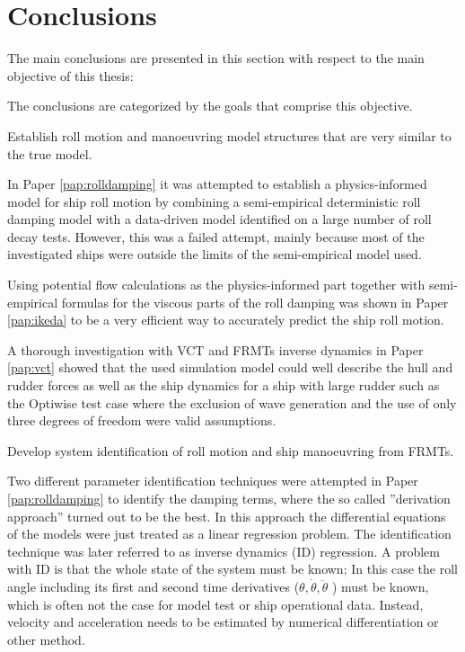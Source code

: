 \chapter{Conclusions\label{ch:conclusions}}

The main conclusions are presented in this section with respect to the main objective of this thesis:
\begin{tcolorbox}[sharp corners,title=Objective]
\objective
\end{tcolorbox}
\vspace{0.3cm}
\noindent The conclusions are categorized by the goals that comprise this objective.

\begin{tcolorbox}[sharp corners,title=RO1]
Establish roll motion and manoeuvring model structures that are very similar to the true model.
\end{tcolorbox}
In Paper \ref{pap:rolldamping} it was attempted to establish a physics-informed model for ship roll motion by combining a semi-empirical deterministic roll damping model with a data-driven model identified on a large number of roll decay tests. However, this was a failed attempt, mainly because most of the investigated ships were outside the limits of the semi-empirical model used.  

Using potential flow calculations as the physics-informed part together with semi-empirical formulas for the viscous parts of the roll damping was shown in Paper \ref{pap:ikeda} to be a very efficient way to accurately predict the ship roll motion.

A thorough investigation with VCT and FRMTs inverse dynamics in Paper \ref{pap:vct} showed that the used simulation model could well describe the hull and rudder forces as well as the ship dynamics for a ship with large rudder such as the Optiwise test case where the exclusion of wave generation and the use of only three degrees of freedom were valid assumptions. 

\begin{tcolorbox}[sharp corners,title=RO2]
Develop system identification of roll motion and ship manoeuvring from FRMTs.
\end{tcolorbox}
Two different parameter identification techniques were attempted in Paper \ref{pap:rolldamping} to identify the damping terms, where the so called ''derivation approach'' turned out to be the best. In this approach the differential equations of the models were just treated as a linear regression problem. The identification technique was later referred to as inverse dynamics (ID) regression. A problem with ID is that the whole state of the system must be known; In this case the roll angle including its first and second time derivatives ($\theta,\dot{\theta},\ddot{\theta}$ ) must be known, which is often not the case for model test or ship operational data. Instead, velocity and acceleration needs to be estimated by numerical differentiation or other method.

